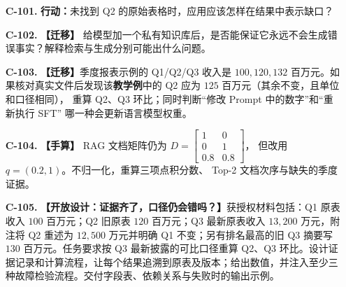 \begin{enumerate}[label={},leftmargin=4.8em,itemsep=4pt]
\item[\textbf{C-101.}] \leavevmode{}\label{exercise:C-101}\label{exercise:missing-evidence-response}\textbf{行动：}未找到 Q2 的原始表格时，应用应该怎样在结果中表示缺口？
\item[\textbf{C-102.}] \leavevmode{}\label{exercise:C-102}\label{exercise:rag-failure-modes}\textbf{【迁移】} 给模型加一个私有知识库后，是否能保证它永远不会生成错误事实？解释检索与生成分别可能出什么问题。
\item[\textbf{C-103.}] \leavevmode{}\label{exercise:C-103}\label{exercise:quarterly-evidence-update}\textbf{【迁移】}季度报表示例的 Q1/Q2/Q3 收入是 $100,120,132$
百万元。如果核对真实文件后发现该\textbf{教学例}中的 Q2 应为
$125$ 百万元（其余不变，且单位和口径相同），
重算 Q2、Q3 环比；同时判断“修改 Prompt 中的数字”和“重新执行 SFT”
哪一种会更新语言模型权重。
\item[\textbf{C-104.}] \leavevmode{}\label{exercise:C-104}\label{exercise:rag-query-ranking}\textbf{【手算】} RAG 文档矩阵仍为
$D=\begin{bmatrix}1&0\\0&1\\0.8&0.8\end{bmatrix}$，
但改用 $q=(0.2,1)$。不归一化，重算三项点积分数、
Top-2 文档次序与缺失的季度证据。
\item[\textbf{C-105.}] \leavevmode{}\label{exercise:C-105}\label{exercise:rag-versioned-evidence-audit}\textbf{【开放设计：证据齐了，口径仍会错吗？】}获授权材料包括：Q1 原表收入 $100$ 百万元；Q2 旧原表 $120$ 百万元；Q3 最新原表收入 $13{,}200$ 万元，附注将 Q2 重述为 $12{,}500$ 万元并明确 Q1 不变；另有排名最高的旧 Q3 摘要写 $130$ 百万元。任务要求按 Q3 最新披露的可比口径重算 Q2、Q3 环比。设计证据记录和计算流程，让每个结果追溯到原表及版本；给出数值，并注入至少三种故障检验流程。交付字段表、依赖关系与失败时的输出示例。
\end{enumerate}
